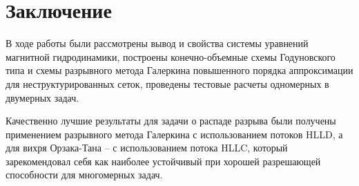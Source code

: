 \documentclass[14pt, a4paper, fleqn]{extreport}
\begin{document}
	\chapter*{Заключение}
	
	В ходе работы были рассмотрены вывод и свойства системы уравнений магнитной 
	гидродинамики, построены конечно-объемные схемы Годуновского типа
	и схемы разрывного метода Галеркина повышенного порядка аппроксимации
	для неструктурированных сеток, проведены тестовые расчеты
	одномерных в двумерных задач.
	
	Качественно лучшие результаты для задачи о распаде разрыва
	были получены применением разрывного метода Галеркина 
	с использованием потоков HLLD,
	а для вихря Орзака-Тана -- с использованием потока HLLC, который
	зарекомендовал себя как наиболее устойчивый при хорошей 
	разрешающей способности для многомерных задач.
	
	
	
\end{document}
